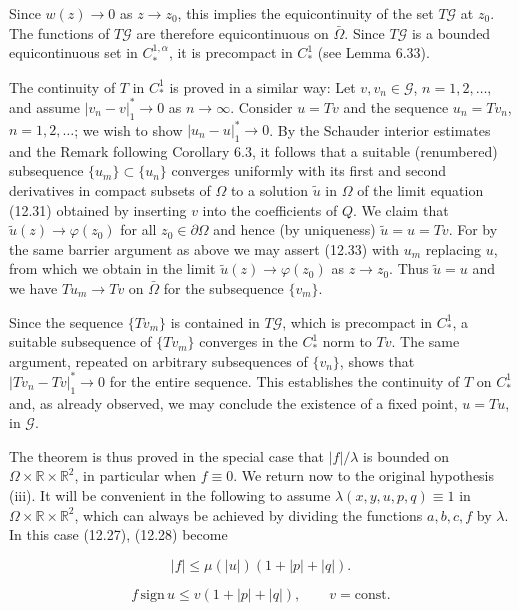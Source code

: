 Since $w(z)\to 0$ as $z\to z_0$, this implies the equicontinuity of the set $T\mathcal{G}$ at $z_0$. The functions of $T\mathcal{G}$ are therefore equicontinuous on $\bar{\Omega}$. Since $T\mathcal{G}$ is a bounded equicontinuous set in $C_*^{1,\alpha}$, it is precompact in $C_*^1$ (see Lemma 6.33).

The continuity of $T$ in $C_*^1$ is proved in a similar way: Let $v,v_n\in\mathcal{G}$, $n=1,2,\ldots,$ and assume $|v_n-v|_1^*\to 0$ as $n\to\infty$. Consider $u=Tv$ and the sequence $u_n=Tv_n$, $n=1,2,\ldots$; we wish to show $|u_n-u|_1^*\to 0$. By the Schauder interior estimates and the Remark following Corollary 6.3, it follows that a suitable (renumbered) subsequence $\{u_m\}\subset\{u_n\}$ converges uniformly with its first and second derivatives in compact subsets of $\Omega$ to a solution $\tilde{u}$ in $\Omega$ of the limit equation (12.31) obtained by inserting $v$ into the coefficients of $Q$. We claim that $\tilde{u}(z)\to\varphi(z_0)$ for all $z_0\in\partial\Omega$ and hence (by uniqueness) $\tilde{u}=u=Tv$. For by the same barrier argument as above we may assert (12.33) with $u_m$ replacing $u$, from which we obtain in the limit
$\tilde{u}(z)\to\varphi(z_0)$ as $z\to z_0$. Thus $\tilde{u}=u$ and we have $Tu_m\to Tv$ on $\bar{\Omega}$ for the subsequence $\{v_m\}$.

Since the sequence $\{Tv_m\}$ is contained in $T\mathcal{G}$, which is precompact in $C_*^1$, a suitable subsequence of $\{Tv_m\}$ converges in the $C_*^1$ norm to $Tv$. The same argument, repeated on arbitrary subsequences of $\{v_n\}$, shows that $|Tv_n-Tv|_1^*\to 0$ for the entire sequence. This establishes the continuity of $T$ on $C_*^1$ and, as already observed, we may conclude the existence of a fixed point, $u=Tu$, in $\mathcal{G}$.

The theorem is thus proved in the special case that $|f|/\lambda$ is bounded on $\Omega\times\mathbb{R}\times\mathbb{R}^2$, in particular when $f\equiv 0$. We return now to the original hypothesis (iii). It will be convenient in the following to assume $\lambda(x,y,u,p,q)\equiv 1$ in $\Omega\times\mathbb{R}\times\mathbb{R}^2$, which can always be achieved by dividing the functions $a,b,c,f$ by $\lambda$. In this case (12.27), (12.28) become

\begin{equation}
\tag{12.34}
|f|\leq \mu(|u|)(1+|p|+|q|).
\end{equation}

\begin{equation}
\tag{12.35}
f\,\mathrm{sign}\,u\leq v(1+|p|+|q|),\qquad v=\mathrm{const}.
\end{equation}

